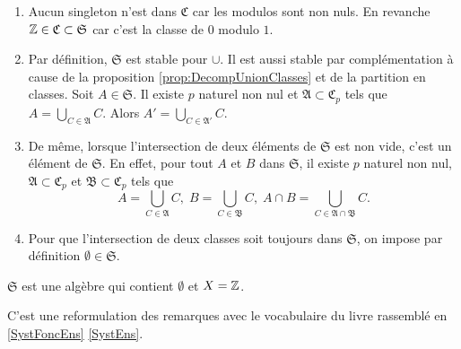 \begin{rems}
 \begin{enumerate}
  \item  Aucun singleton n'est dans $\mathfrak{C}$ car les modulos sont non nuls. En revanche $\mathbb{Z} \in \mathfrak{C} \subset \mathfrak{S}$ car c'est la classe de $0$ modulo $1$.

  \item Par définition, $\mathfrak{S}$ est stable pour $\cup$. Il est aussi stable par complémentation à cause de la proposition \ref{prop:DecompUnionClasses} et de la partition en classes. Soit $A\in \mathfrak{S}$. Il existe $p$ naturel non nul et $\mathfrak{A}\subset \mathfrak{C}_p$ tels que $A = \bigcup_{C \in \mathfrak{A}} C$. Alors $A' = \bigcup_{C \in \mathfrak{A}'} C$.

  \item De même, lorsque l'intersection de deux éléments de $\mathfrak{S}$ est non vide, c'est un élément de $\mathfrak{S}$. En effet, pour tout $A$ et $B$ dans $\mathfrak{S}$, il existe $p$ naturel non nul, $\mathfrak{A}\subset \mathfrak{C}_p$ et $\mathfrak{B}\subset \mathfrak{C}_p$ tels que
  \begin{displaymath}
   A = \bigcup_{C \in \mathfrak{A}} C, \; B = \bigcup_{C \in \mathfrak{B}} C, \; A\cap B = \bigcup_{C \in \mathfrak{A}\cap \mathfrak{B}} C.
  \end{displaymath}

  \item Pour que l'intersection de deux classes soit toujours dans $\mathfrak{S}$, on impose par définition $\emptyset \in \mathfrak{S}$.
\end{enumerate}
\end{rems}

\begin{prop}
  $\mathfrak{S}$ est une algèbre qui contient $\emptyset$ et $X=\mathbb{Z}$.
\end{prop}
\begin{demo}
 C'est une reformulation des remarques avec le vocabulaire du livre rassemblé en \ref{SystFoncEns} \ref{SystEns}.
\end{demo}

